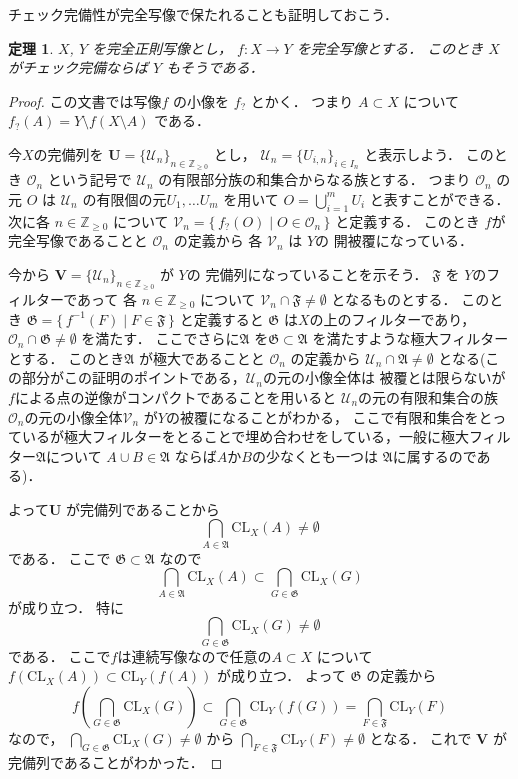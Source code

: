 \documentclass[leqno, a4paper, 12pt]{jsarticle}
\newtheorem{thm}{定理}
\newcommand{\zz}{\mathbb{Z}}
\newcommand{\cl}{\mathrm{CL}}
\newcommand{\mysm}[1]{#1_{?}}
\begin{document}
チェック完備性が完全写像で保たれることも証明しておこう．
\begin{thm}
$X$, 
$Y$
を完全正則写像とし，
$f\colon X\to Y$
を完全写像とする．
このとき
$X$
がチェック完備ならば
$Y$
もそうである．
\end{thm}
\begin{proof}
この文書では写像$f$
の小像を
$\mysm{f}$
とかく．
つまり
$A\subset X$
について
$\mysm{f}(A)=Y\setminus f(X\setminus A)$
である．

今$X$の完備列を
$\mathbf{U}=\{\mathcal{U}_{n}\}_{n\in \zz_{\ge 0}}$
とし，
$\mathcal{U}_{n}=\{U_{i, n}\}_{i\in I_{n}}$
と表示しよう．
このとき
$\mathcal{O}_{n}$
という記号で
$\mathcal{U}_{n}$
の有限部分族の和集合からなる族とする．
つまり
$\mathcal{O}_{n}$
の元
$O$
は
$\mathcal{U}_{n}$
の有限個の元$U_{1}, \dots U_{m}$
を用いて
$O=\bigcup_{i=1}^{m}U_{i}$
と表すことができる．
次に各
$n\in \zz_{\ge 0}$
について
$\mathcal{V}_{n}=\{\, \mysm{f}(O)\mid O\in \mathcal{O}_{n}\, \}$
と定義する．
このとき
$f$が完全写像であることと
$\mathcal{O}_{n}$
の定義から
各
$\mathcal{V}_{n}$
は
$Y$の
開被覆になっている．

今から
$\mathbf{V}=\{\mathcal{U}_{n}\}_{n\in \zz_{\ge 0}}$
が
$Y$の
完備列になっていることを示そう．
$\mathfrak{F}$
を
$Y$のフィルターであって
各
$n\in \zz_{\ge 0}$
について
$\mathcal{V}_{n}\cap \mathfrak{F}\neq \emptyset$
となるものとする．
このとき
$\mathfrak{G}=\{\, f^{-1}(F)\mid F\in \mathfrak{F}\, \}$
と定義すると
$\mathfrak{G}$
は$X$の上のフィルターであり，
$\mathcal{O}_{n}\cap \mathfrak{G}\neq \emptyset$
を満たす．
ここでさらに$\mathfrak{A}$
を$\mathfrak{G}\subset \mathfrak{A}$
を満たすような極大フィルターとする．
このとき$\mathfrak{A}$
が極大であることと
$\mathcal{O}_{n}$
の定義から
$\mathcal{U}_{n}\cap \mathfrak{A}\neq \emptyset$
となる(この部分がこの証明のポイントである，$\mathcal{U}_{n}$の元の小像全体は
被覆とは限らないが$f$による点の逆像がコンパクトであることを用いると
$\mathcal{U}_{n}$の元の有限和集合の族$\mathcal{O}_{n}$の元の小像全体$\mathcal{V}_{n}$
が$Y$の被覆になることがわかる，
ここで有限和集合をとっているが極大フィルターをとることで埋め合わせをしている，一般に極大フィルター$\mathfrak{A}$について
$A\cup B\in \mathfrak{A}$
ならば$A$か$B$の少なくとも一つは
$\mathfrak{A}$に属するのである)．

よって$\mathbf{U}$
が完備列であることから
\[
\bigcap_{A\in \mathfrak{A}}\cl_{X}(A)\neq \emptyset
\]
である．
ここで
$\mathfrak{G}\subset \mathfrak{A}$
なので
\[
\bigcap_{A\in \mathfrak{A}}\cl_{X}(A)\subset 
\bigcap_{G\in \mathfrak{G}}\cl_{X}(G)
\]
が成り立つ．
特に
\[
\bigcap_{G\in \mathfrak{G}}\cl_{X}(G)\neq \emptyset
\]
である．
ここで$f$は連続写像なので任意の$A\subset X$
について
$f(\cl_{X}(A))\subset \cl_{Y}(f(A))$
が成り立つ．
よって
$\mathfrak{G}$
の定義から
\[
f\left(\bigcap_{G\in \mathfrak{G}}\cl_{X}(G)\right)
\subset 
\bigcap_{G\in \mathfrak{G}}\cl_{Y}(f(G))
=
\bigcap_{F\in \mathfrak{F}}\cl_{Y}(F)
\]
なので，
$\bigcap_{G\in \mathfrak{G}}\cl_{X}(G)\neq \emptyset$
から
$\bigcap_{F\in \mathfrak{F}}\cl_{Y}(F)\neq \emptyset$
となる．
これで
$\mathbf{V}$
が完備列であることがわかった．
\end{proof}
\end{document}
